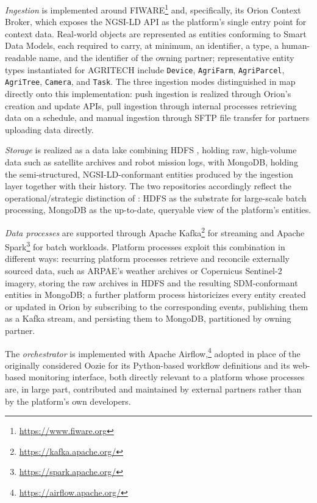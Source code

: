 \emph{Ingestion} is implemented around FIWARE\footnote{\url{https://www.fiware.org}} and, specifically, its Orion Context Broker, which exposes the NGSI-LD API as the platform's single entry point for context data. Real-world objects are represented as entities conforming to Smart Data Models, each required to carry, at minimum, an identifier, a type, a human-readable name, and the identifier of the owning partner; representative entity types instantiated for AGRITECH include \texttt{Device}, \texttt{AgriFarm}, \texttt{AgriParcel}, \texttt{AgriTree}, \texttt{Camera}, and \texttt{Task}. The three ingestion modes distinguished in  map directly onto this implementation: push ingestion is realized through Orion's creation and update APIs, pull ingestion through internal processes retrieving data on a schedule, and manual ingestion through SFTP file transfer for partners uploading data directly.

\emph{Storage} is realized as a data lake combining HDFS \cite{white2012hadoop}, holding raw, high-volume data such as satellite archives and robot mission logs, with MongoDB, holding the semi-structured, NGSI-LD-conformant entities produced by the ingestion layer together with their history. The two repositories accordingly reflect the operational/strategic distinction of : HDFS as the substrate for large-scale batch processing, MongoDB as the up-to-date, queryable view of the platform's entities.

\emph{Data processes} are supported through Apache Kafka\footnote{\url{https://kafka.apache.org/}} \cite{shapira2021kafka} for streaming and Apache Spark\footnote{\url{https://spark.apache.org/}} \cite{chambers2018spark} for batch workloads. Platform processes exploit this combination in different ways: recurring platform processes retrieve and reconcile externally sourced data, such as ARPAE's weather archives or Copernicus Sentinel-2 imagery, storing the raw archives in HDFS and the resulting SDM-conformant entities in MongoDB; a further platform process historicizes every entity created or updated in Orion by subscribing to the corresponding events, publishing them as a Kafka stream, and persisting them to MongoDB, partitioned by owning partner.

The \emph{orchestrator} is implemented with Apache Airflow,\footnote{\url{https://airflow.apache.org/}} adopted in place of the originally considered Oozie for its Python-based workflow definitions and its web-based monitoring interface, both directly relevant to a platform whose processes are, in large part, contributed and maintained by external partners rather than by the platform's own developers.

